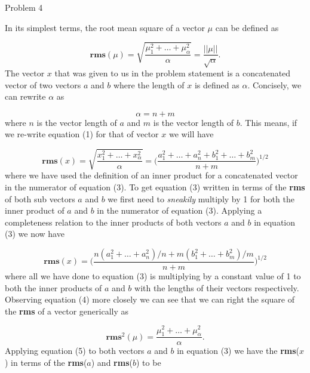 \begin{problem}{Problem 4}
\begin{Highlight}
        In its simplest terms, the root mean square of a vector $\mu$ can be defined as 

        \setcounter{equation}{0}
        \begin{equation}
            \mathbf{rms}(\mu) = \sqrt{\frac{\mu^{2}_{1} + \dots + \mu^{2}_{\alpha}}{\alpha}} = \frac{||\mu||}{\sqrt{\alpha}}.
        \end{equation}
        The vector $x$ that was given to us in the problem statement is a concatenated vector of two vectors $a$ and $b$ where the length of $x$ is defined as $\alpha$. Concisely, we can rewrite $\alpha$
        as 

        \begin{equation}
            \alpha = n + m
        \end{equation}
        where $n$ is the vector length of $a$ and $m$ is the vector length of $b$. This means, if we re-write equation (1) for that of vector $x$ we will have

        \begin{equation}
            \mathbf{rms}(x) = \sqrt{\frac{x^{2}_{1} + \dots + x^{2}_{\alpha}}{\alpha}} = \Bigg(\frac{a^{2}_{1} + \dots + a^{2}_{n} + b^{2}_{1} + \dots + b^{2}_{m}}{n + m} \Bigg)^{1/2}
        \end{equation}
        where we have used the definition of an inner product for a concatenated vector in the numerator of equation (3). To get equation (3) written in terms of the \textbf{rms} of both sub vectors $a$ and
        $b$ we first need to \textit{sneakily} multiply by 1 for both the inner product of $a$ and $b$ in the numerator of equation (3). Applying a completeness relation to the inner products of both vectors $a$
        and $b$ in equation (3) we now have

        \begin{equation}
            \mathbf{rms}(x) = \Bigg(\frac{n(a^{2}_{1} + \dots + a^{2}_{n})/n + m(b^{2}_{1} + \dots + b^{2}_{m})/m}{n + m} \Bigg)^{1/2}
        \end{equation}
        where all we have done to equation (3) is multiplying by a constant value of 1 to both the inner products of $a$ and $b$ with the lengths of their vectors respectively. Observing equation (4) more closely
        we can see that we can right the square of the \textbf{rms} of a vector generically as

        \begin{equation}
            \mathbf{rms}^{2}(\mu) = \frac{\mu^{2}_{1} + \dots + \mu^{2}_{\alpha}}{\alpha}.
        \end{equation}
        Applying equation (5) to both vectors $a$ and $b$ in equation (3) we have the \textbf{rms}($x$) in terms of the \textbf{rms}($a$) and \textbf{rms}($b$) to be


\end{Highlight}
\end{problem}

